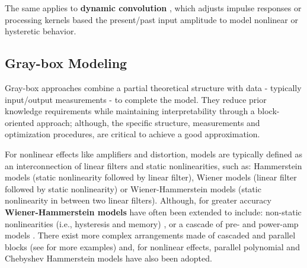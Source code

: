 The same applies to \textbf{dynamic convolution}
\citep{
kemp1999analysis, 
primavera2012approximation}
, which adjusts impulse responses or processing kernels based the present/past input amplitude to model nonlinear or hysteretic behavior.

\subsection{Gray-box Modeling}
\label{sec:back-gray-box}

Gray-box approaches combine a partial theoretical structure with data - typically input/output measurements - to complete the model.
They reduce prior knowledge requirements while maintaining interpretability through a block-oriented approach; although, the specific structure, measurements and optimization procedures, are critical to achieve a good approximation.

For nonlinear effects like amplifiers and distortion, models are typically defined as an interconnection of linear filters and static nonlinearities, such as: Hammerstein models (static nonlinearity followed by linear filter), Wiener models (linear filter followed by static nonlinearity) or Wiener-Hammerstein models (static nonlinearity in between two linear filters).
Although, for greater accuracy \textbf{Wiener-Hammerstein models} have often been extended to include: 
non-static nonlinearities (i.e., hysteresis and memory) 
\citep{
eichas2015block, 
eichas2016black, 
eichas2018gray},
or a cascade of pre- and power-amp models 
\citep{
kemper2014musical, 
eichas2017block}.
There exist more complex arrangements made of cascaded and parallel blocks (see \citep{schoukens2019nonlinear} for more examples) and, for nonlinear effects, 
parallel polynomial 
\citep{
novak2009nonlinear, 
cauduro2012reduced} 
and Chebyshev 
\citep{
novak2010chebyshev, 
bank2011computationally} 
Hammerstein models have also been adopted.

